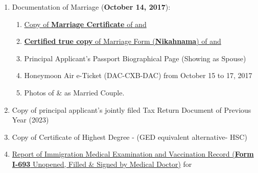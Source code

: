\begin{enumerate}[label=\textbf{ Exhibit-\arabic*},start=15]
    
    
    \item Documentation of Marriage (\textbf{October 14, 2017}):
    \begin{enumerate}[label=\roman*.]
        \item \hyperref[exhibit12a]{Copy of \textbf{Marriage Certificate} of \textit{\pApplicant} and \textit{\dApplicant}}
        \item \hyperref[exhibit12b]{\textbf{Certified true copy} of Marriage Form (\textbf{Nikahnama}) of \textit{\pApplicant} and \textit{\dApplicant}}
        \item Principal Applicant's Passport Biographical Page (Showing \textit{\dApplicant} as Spouse)
        \item Honeymoon Air e-Ticket (DAC-CXB-DAC) from October 15 to 17, 2017
        \item Photos of \textit{\pApplicant} \& \textit{\dApplicant} as Married Couple.
    \end{enumerate}

    \item Copy of principal applicant's jointly filed Tax Return Document of Previous Year (2023)

    \item Copy of Certificate of Highest Degree - (GED equivalent alternative- HSC)
    \item \hyperref[exhibit14]{Report of Immigration Medical Examination and Vaccination Record (\textbf{Form I-693} Unopened, Filled \& Signed by Medical Doctor)} for \textit{\dApplicant}
\end{enumerate}